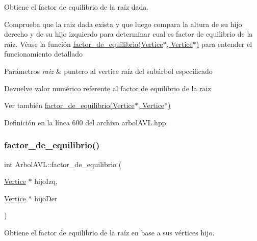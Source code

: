 Obtiene el factor de equilibrio de la raíz dada. 

Comprueba que la raiz dada exista y que luego compara la altura de su hijo derecho y de su hijo izquierdo para determinar cual es factor de equilibrio de la raiz. Véase la función \hyperlink{classArbolAVL_a8cf229fd1482232fbfe4803043eeec14}{factor\+\_\+de\+\_\+equilibrio(\+Vertice$\ast$, Vertice$\ast$)} para entender el funcionamiento detallado 
\begin{DoxyParams}{Parámetros}
{\em raiz} & puntero al vertice raíz del subárbol especificado \\
\hline
\end{DoxyParams}
\begin{DoxyReturn}{Devuelve}
valor numérico referente al factor de equilibrio de la raiz 
\end{DoxyReturn}
\begin{DoxySeeAlso}{Ver también}
\hyperlink{classArbolAVL_a8cf229fd1482232fbfe4803043eeec14}{factor\+\_\+de\+\_\+equilibrio(\+Vertice$\ast$, Vertice$\ast$)} 
\end{DoxySeeAlso}


Definición en la línea 600 del archivo arbol\+A\+V\+L.\+hpp.

\mbox{\label{classArbolAVL_a8cf229fd1482232fbfe4803043eeec14}} 
\subsubsection{\texorpdfstring{factor\+\_\+de\+\_\+equilibrio()}{factor\_de\_equilibrio()}\hspace{0.1cm}{\footnotesize\ttfamily [2/2]}}
{\footnotesize\ttfamily int Arbol\+A\+V\+L\+::factor\+\_\+de\+\_\+equilibrio (\begin{DoxyParamCaption}\item[{\hyperlink{classVertice}{Vertice} $\ast$}]{hijo\+Izq,  }\item[{\hyperlink{classVertice}{Vertice} $\ast$}]{hijo\+Der }\end{DoxyParamCaption})\hspace{0.3cm}{\ttfamily [protected]}}



Obtiene el factor de equilibrio de la raíz en base a sus vértices hijo. 


